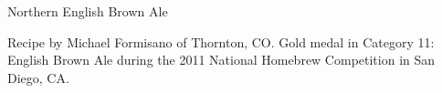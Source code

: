 \begin{recipe}{Northern English Brown Ale} %

\begin{aboutblock}
Recipe by Michael Formisano of Thornton, CO. Gold medal in Category 11: English
Brown Ale during the 2011 National Homebrew Competition in San Diego, CA.
\sourceaha
\end{aboutblock}


\begin{methodandtiming}

\begin{mashsteps}
\end{mashsteps}

\begin{fermentationsteps}
\end{fermentationsteps}

\end{methodandtiming}

\recipebreak

\begin{ingredientsblock}

\begin{malts}
\end{malts}

\begin{hops}
\end{hops}


\end{ingredientsblock}

\end{recipe}

